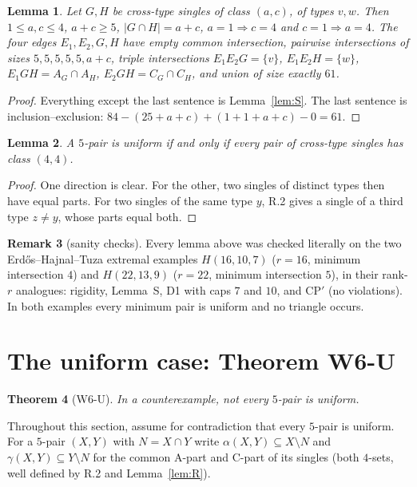 \documentclass[11pt]{amsart}
\newtheorem{theorem}{Theorem}[section]
\newtheorem{lemma}[theorem]{Lemma}
\theoremstyle{definition}
\newtheorem{remark}[theorem]{Remark}
\begin{document}
\begin{lemma}\label{lem:class}
Let $G,H$ be cross-type singles of class $(a,c)$, of types $v,w$. Then $1\le a,c\le 4$, $a+c\ge 5$, $|G\cap H|=a+c$, $a=1\Rightarrow c=4$ and $c=1\Rightarrow a=4$. The four edges $E_1,E_2,G,H$ have empty common intersection, pairwise intersections of sizes $5,5,5,5,5,a+c$, triple intersections $E_1E_2G=\{v\}$, $E_1E_2H=\{w\}$, $E_1GH=A_G\cap A_H$, $E_2GH=C_G\cap C_H$, and union of size exactly $61$.
\end{lemma}
\begin{proof}
Everything except the last sentence is Lemma~\ref{lem:S}. The last sentence is inclusion--exclusion: $84-(25+a+c)+(1+1+a+c)-0=61$.
\end{proof}

\begin{lemma}\label{lem:uniform44}
A $5$-pair is uniform if and only if every pair of cross-type singles has class $(4,4)$.
\end{lemma}
\begin{proof}
One direction is clear. For the other, two singles of distinct types then have equal parts. For two singles of the same type $y$, R.2 gives a single of a third type $z\ne y$, whose parts equal both.
\end{proof}

\begin{remark}[sanity checks]
Every lemma above was checked literally on the two Erd\H{o}s--Hajnal--Tuza extremal examples $H(16,10,7)$ ($r=16$, minimum intersection $4$) and $H(22,13,9)$ ($r=22$, minimum intersection $5$), in their rank-$r$ analogues: rigidity, Lemma~S, D1 with caps $7$ and $10$, and CP$'$ (no violations). In both examples every minimum pair is uniform and no triangle occurs.
\end{remark}

\section{The uniform case: Theorem W6-U}\label{sec:W6U}

\begin{theorem}[W6-U]\label{thm:W6U}
In a counterexample, not every $5$-pair is uniform.
\end{theorem}

Throughout this section, assume for contradiction that every $5$-pair is uniform. For a $5$-pair $(X,Y)$ with $N=X\cap Y$ write $\alpha(X,Y)\subseteq X\setminus N$ and $\gamma(X,Y)\subseteq Y\setminus N$ for the common A-part and C-part of its singles (both $4$-sets, well defined by R.2 and Lemma~\ref{lem:R}).
\end{document}
